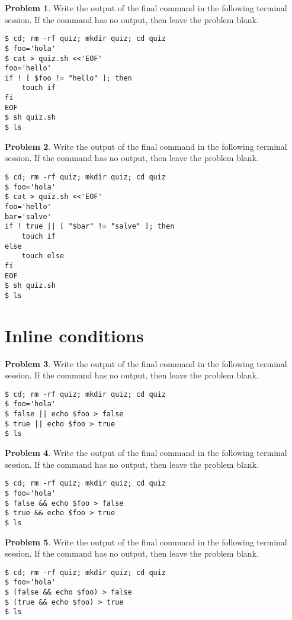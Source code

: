 \documentclass[10pt]{article}
\theoremstyle{definition}
\newtheorem{problem}{Problem}
\begin{document}
\filbreak
\begin{problem}
    Write the output of the final command in the following terminal session.
    If the command has no output, then leave the problem blank.
\end{problem}
\begin{lstlisting}
$ cd; rm -rf quiz; mkdir quiz; cd quiz
$ foo='hola'
$ cat > quiz.sh <<'EOF'
foo='hello'
if ! [ $foo != "hello" ]; then
    touch if
fi
EOF
$ sh quiz.sh
$ ls
\end{lstlisting}

\filbreak
\begin{problem}
    Write the output of the final command in the following terminal session.
    If the command has no output, then leave the problem blank.
\end{problem}
\begin{lstlisting}
$ cd; rm -rf quiz; mkdir quiz; cd quiz
$ foo='hola'
$ cat > quiz.sh <<'EOF'
foo='hello'
bar='salve'
if ! true || [ "$bar" != "salve" ]; then
    touch if
else
    touch else
fi
EOF
$ sh quiz.sh
$ ls
\end{lstlisting}

\section{Inline conditions}

\filbreak
\begin{problem}
    Write the output of the final command in the following terminal session.
    If the command has no output, then leave the problem blank.
\end{problem}
\begin{lstlisting}
$ cd; rm -rf quiz; mkdir quiz; cd quiz
$ foo='hola'
$ false || echo $foo > false
$ true || echo $foo > true
$ ls
\end{lstlisting}


\filbreak
\begin{problem}
    Write the output of the final command in the following terminal session.
    If the command has no output, then leave the problem blank.
\end{problem}
\begin{lstlisting}
$ cd; rm -rf quiz; mkdir quiz; cd quiz
$ foo='hola'
$ false && echo $foo > false
$ true && echo $foo > true
$ ls
\end{lstlisting}

\filbreak
\begin{problem}
    Write the output of the final command in the following terminal session.
    If the command has no output, then leave the problem blank.
\end{problem}
\begin{lstlisting}
$ cd; rm -rf quiz; mkdir quiz; cd quiz
$ foo='hola'
$ (false && echo $foo) > false
$ (true && echo $foo) > true
$ ls
\end{lstlisting}
\end{document}
